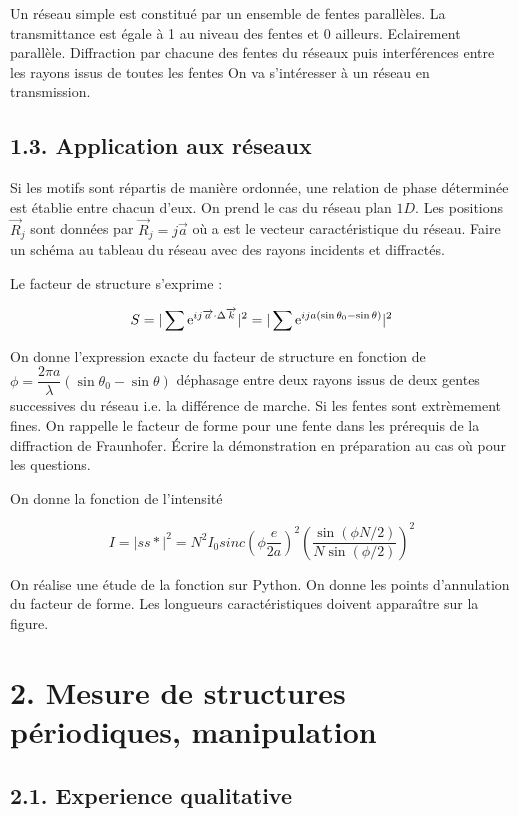 \documentclass[french, a4paper, 10pt, twocolumn, landscape]{article}
\begin{document}
Un réseau simple est constitué par un ensemble de fentes parallèles. La
transmittance est égale à 1 au niveau des fentes et 0 ailleurs.
Eclairement parallèle. Diffraction par chacune des fentes du réseaux puis
interférences entre les rayons issus de toutes les fentes
On va s'intéresser à un réseau en transmission.

\subsection*{1.3. Application aux réseaux}

Si les motifs sont répartis de manière ordonnée, une relation de phase déterminée est établie entre chacun d'eux. On prend le cas du réseau plan $1D$. Les positions $\vec{R}_j$ sont données par $\vec{R}_j=j\vec{a}$ où a est le vecteur caractéristique du réseau. Faire un schéma au tableau du réseau avec des rayons incidents et diffractés.

Le facteur de structure s'exprime :

\begin{equation}
    S = |\sum {\rm e}^{ij\vec{a}\cdot \Delta\vec{k}}|^2 = |\sum {\rm e}^{ija(\sin\theta_0-\sin\theta)}|^2
\end{equation}

On donne l'expression exacte du facteur de structure en fonction de $\phi = \dfrac{2\pi a}{\lambda}(\sin\theta_0-\sin\theta)$ déphasage entre deux rayons issus de deux gentes successives du réseau i.e. la différence de marche. 
Si les fentes sont extrèmement fines. On rappelle le facteur de forme pour une fente dans les prérequis de la diffraction de Fraunhofer. Écrire la démonstration en préparation au cas où pour les questions.

On donne la fonction de l'intensité 

\begin{equation}
    I = |ss*|^2 = N^2I_0 sinc(\phi \dfrac{e}{2a})^2\left(\dfrac{\sin(\phi N/2)}{N\sin(\phi/2)}\right)^2 
\end{equation}

On réalise une étude de la fonction sur Python. On donne les points d'annulation du facteur de forme. Les longueurs caractéristiques doivent apparaître sur la figure.

\section*{2. Mesure de structures périodiques, manipulation}

\subsection*{2.1. Experience qualitative}
\end{document}
